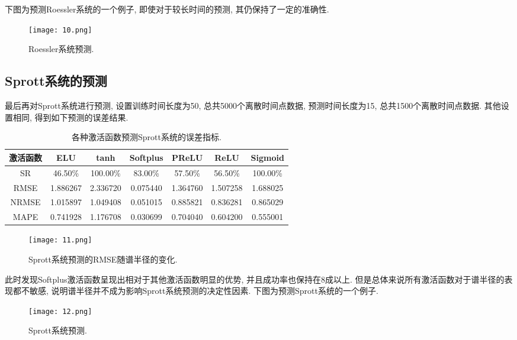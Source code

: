 \documentclass[notitlepage,cs4size,punct,oneside]{ctexrep}
\numberwithin{equation}{chapter}
\theoremstyle{mystyle}
\begin{document}
下图为预测Roessler系统的一个例子, 即使对于较长时间的预测, 其仍保持了一定的准确性. 

\begin{figure}[htbp]
    \centering
    \texttt{[image: 10.png]}
    \caption{Roessler系统预测.}
\end{figure}

\subsection{Sprott系统的预测}
最后再对Sprott系统进行预测, 设置训练时间长度为50, 总共5000个离散时间点数据, 
预测时间长度为15, 总共1500个离散时间点数据. 其他设置相同,
得到如下预测的误差结果. 
\begin{table}[htbp]\centering
    \caption{各种激活函数预测Sprott系统的误差指标.}
    \begin{tabular}{ccccccc}
    \hline\hline
    激活函数 & ELU & tanh & Softplus & PReLU & ReLU & Sigmoid \\
    \hline
    SR   & 46.50\% & 100.00\% & 83.00\% & 57.50\% & 56.50\% & 100.00\% \\
    RMSE   & 1.886267 & 2.336720 & 0.075440 & 1.364760 & 1.507258 & 1.688025 \\
    NRMSE   & 1.015897 & 1.049408 & 0.051015 & 0.885821 & 0.836281 & 0.865029 \\
    MAPE   & 0.741928 & 1.176708 & 0.030699 & 0.704040 & 0.604200 & 0.555001 \\
    \hline\hline
    \end{tabular}
\end{table}
\begin{figure}[htbp]
    \centering
    \texttt{[image: 11.png]}
    \caption{Sprott系统预测的RMSE随谱半径的变化.}
\end{figure}

此时发现Softplus激活函数呈现出相对于其他激活函数明显的优势, 并且成功率也保持在8成以上. 
但是总体来说所有激活函数对于谱半径的表现都不敏感, 说明谱半径并不成为影响Sprott系统预测的决定性因素.
下图为预测Sprott系统的一个例子.
\begin{figure}[htbp]
    \centering
    \texttt{[image: 12.png]}
    \caption{Sprott系统预测.}
\end{figure}
\end{document}
